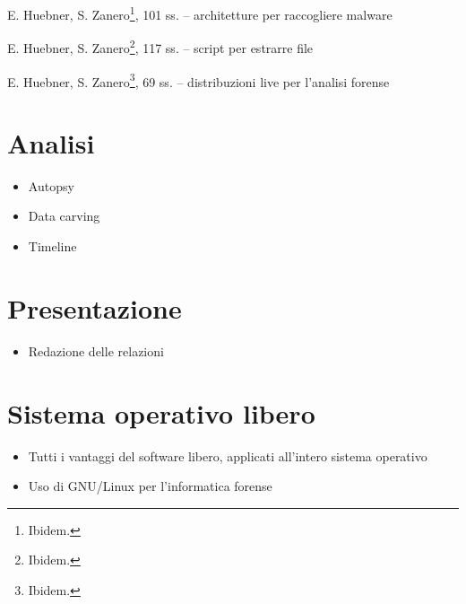 \documentclass[
  12pt,
  a4paper,
]{book}
\providecommand{\tightlist}{%
  \setlength{\itemsep}{0pt}\setlength{\parskip}{0pt}}
\begin{document}
E. Huebner, S. Zanero\footnote{Ibidem.}, 101 ss. -- architetture per
raccogliere malware

E. Huebner, S. Zanero\footnote{Ibidem.}, 117 ss. -- script per estrarre
file

E. Huebner, S. Zanero\footnote{Ibidem.}, 69 ss. -- distribuzioni live
per l'analisi forense

\section{Analisi}\label{analisi}

\begin{itemize}
\tightlist
\item
  Autopsy
\item
  Data carving
\item
  Timeline
\end{itemize}

\section{Presentazione}\label{presentazione}

\begin{itemize}
\tightlist
\item
  Redazione delle relazioni
\end{itemize}

\section{Sistema operativo libero}\label{sistema-operativo-libero}

\begin{itemize}
\tightlist
\item
  Tutti i vantaggi del software libero, applicati all'intero sistema
  operativo
\item
  Uso di GNU/Linux per l'informatica forense
\end{itemize}
\end{document}
